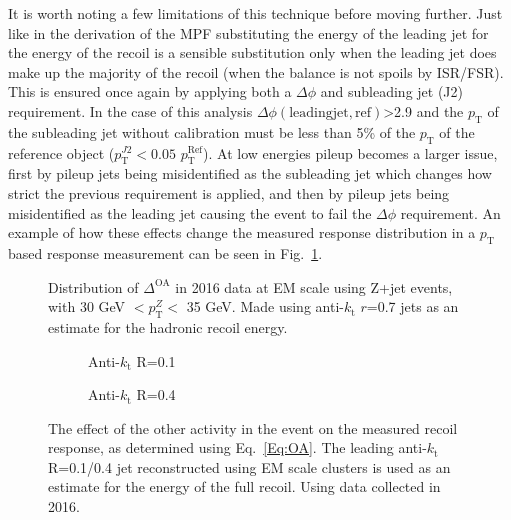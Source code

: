 It is worth noting a few limitations of this technique before moving further.  
Just like in the derivation of the MPF substituting the energy of the leading jet for the energy of the recoil is a sensible substitution only when the leading jet does make up the majority of the recoil (when the balance is not spoils by ISR/FSR).  
This is ensured once again by applying both a $\Delta\phi$ and subleading jet (J2) requirement.  
In the case of this analysis $\Delta\phi\left(\mathrm{leading jet, ref}\right)$>2.9 and the $p_{\mathrm T}$ of the subleading jet without calibration must be less than 5\% of the $p_{\mathrm T}$ of the reference object ($p_{\mathrm T}^{J2}<0.05$ $p_{\mathrm T}^{\mathrm{Ref}}$).  
At low energies pileup becomes a larger issue, first by pileup jets being misidentified as the subleading jet which changes how strict the previous requirement is applied, and then by pileup jets being misidentified as the leading jet causing the event to fail the $\Delta\phi$ requirement.  
An example of how these effects change the measured response distribution in a $p_{\mathrm T}$ based response measurement can be seen in Fig.~\ref{Fig:BalDistExample}.  

\begin{figure}[!ht]
 \begin{center}
  \scalebox{0.75}{
   \texttt{[image: plots/Chap6/OtherActivity/Dists/OADist\_Cone7\_Bin3.eps]}
  }
 \end{center}
 \caption[Example $\Delta^{\mathrm{OA}}$ distribution]
 {\small Distribution of $\Delta^{\mathrm{OA}}$ in 2016 data at EM scale using Z+jet events, with 30 GeV $< p_{\mathrm T}^Z <$ 35 GeV.  Made using anti-$k_{\mathrm t}$ $r$=0.7 jets as an estimate for the hadronic recoil energy.  }
 \label{Fig:BalDistExample}
\end{figure}


\begin{figure}[!ht]
  \centering
  \begin{subfigure}{.5\textwidth}
    \centering
    \caption{Anti-$k_\mathrm{t}$ R=0.1}
  \end{subfigure}%
  \begin{subfigure}{.5\textwidth}  \centering
    \caption{Anti-$k_\mathrm{t}$ R=0.4}
  \end{subfigure}
  \caption[$\Delta^{\mathrm{OA}}$ using anti-$k_\mathrm{t}$ R=0.1/0.4 jets]
{\small The effect of the other activity in the event on the measured recoil response, as determined using Eq.~\ref{Eq:OA}.  The leading anti-$k_\mathrm{t}$ R=0.1/0.4 jet reconstructed using EM scale clusters is used as an estimate for the energy of the full recoil.  Using data collected in 2016.  }
  \label{Fig:OA_1-4}
\end{figure}


